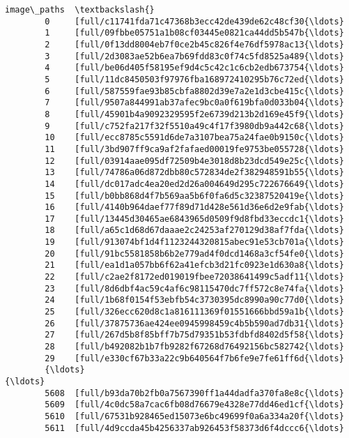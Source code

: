 \documentclass[11pt]{article}
\begin{document}
\begin{Verbatim}[commandchars=\\\{\}]
                                                    image\_paths  \textbackslash{}
        0     [full/c11741fda71c47368b3ecc42de439de62c48cf30{\ldots}   
        1     [full/09fbbe05751a1b08cf03445e0821ca44dd5b547b{\ldots}   
        2     [full/0f13dd8004eb7f0ce2b45c826f4e76df5978ac13{\ldots}   
        3     [full/2d3083ae52b6ea7b69fdd83c0f74c5fd8525a489{\ldots}   
        4     [full/be06d405f58195ef9d4c5c42c1c6cb2edb673754{\ldots}   
        5     [full/11dc8450503f97976fba168972410295b76c72ed{\ldots}   
        6     [full/587559fae93b85cbfa8802d39e7a2e1d3cbe415c{\ldots}   
        7     [full/9507a844991ab37afec9bc0a0f619bfa0d033b04{\ldots}   
        8     [full/45901b4a9092329595f2e6739d213b2d169e45f9{\ldots}   
        9     [full/c752fa217f32f5510a49c4f17f3980db9a442c68{\ldots}   
        10    [full/ecc8785c5591d6de7a3107bea75a24fae0b9150c{\ldots}   
        11    [full/3bd907ff9ca9af2fafaed00019fe9753be055728{\ldots}   
        12    [full/03914aae095df72509b4e3018d8b23dcd549e25c{\ldots}   
        13    [full/74786a06d872dbb80c572834de2f382948591b55{\ldots}   
        14    [full/dc017adc4ea20ed2d26a004649d295c722676649{\ldots}   
        15    [full/b0bb868d4f7b569aa5b6f0fa6d5c32387520419e{\ldots}   
        16    [full/4140b964daef77f89d71d428e561d36e6d2e9fab{\ldots}   
        17    [full/13445d30465ae6843965d0509f9d8fbd33eccdc1{\ldots}   
        18    [full/a65c1d68d67daaae2c24253af270129d38af7fda{\ldots}   
        19    [full/913074bf1d4f1123244320815abec91e53cb701a{\ldots}   
        20    [full/91bc5581858b6b2e779ad4f0dcd1468a3cf54fe0{\ldots}   
        21    [full/ea1d1a057bb6f62a41efcb3d21fc0923e1d630a8{\ldots}   
        22    [full/c2ae2f8172ed019019fbee72038641499c5adf11{\ldots}   
        23    [full/8d6dbf4ac59c4af6c98115470dc7ff572c8e74fa{\ldots}   
        24    [full/1b68f0154f53ebfb54c3730395dc8990a90c77d0{\ldots}   
        25    [full/326ecc620d8c1a816111369f01551666bbd59a1b{\ldots}   
        26    [full/37875736ae424ee0945998459c4b5b590ad7db31{\ldots}   
        27    [full/267d5b8f85bff7b75d79351b53fdbfd8402d5f58{\ldots}   
        28    [full/b492082b1b7fb9282f67268d76492156bc582742{\ldots}   
        29    [full/e330cf67b33a22c9b640564f7b6fe9e7fe61ff6d{\ldots}   
        {\ldots}                                                 {\ldots}   
        5608  [full/b93da70b2fb0a7567390ff1a44dadfa370fa8e8c{\ldots}   
        5609  [full/4c0dc58a7cac6fb08d76679e4328e77dd46ed1cf{\ldots}   
        5610  [full/67531b928465ed15073e6bc49699f0a6a334a20f{\ldots}   
        5611  [full/4d9ccda45b4256337ab926453f58373d6f4dccc6{\ldots}   

\end{Verbatim}
\end{document}
